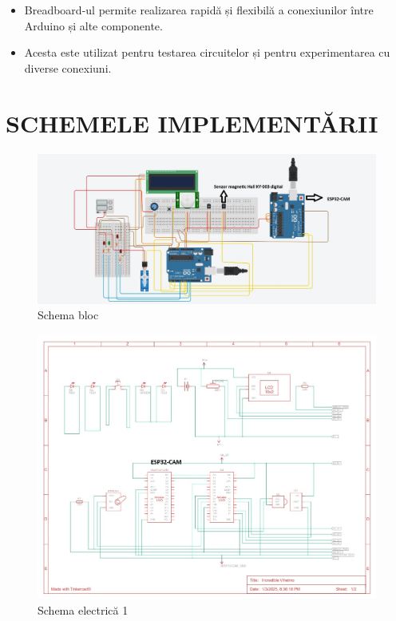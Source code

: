 \documentclass[a4paper,12pt]{report}
\begin{document}
\begin{itemize}
    \item Breadboard-ul permite realizarea rapidă și flexibilă a conexiunilor între Arduino și alte componente.
    \item Acesta este utilizat pentru testarea circuitelor și pentru experimentarea cu diverse conexiuni.
\end{itemize}


\chapter*{SCHEMELE IMPLEMENTĂRII}
\begin{figure}[H]
    \centering
    \includegraphics[width=1.0\linewidth]{SCHEMABLOC.png}
    \caption{Schema bloc}
    \label{fig:enter-label}
\end{figure}

\begin{figure}[H]
    \centering
    \includegraphics[width=0.8\linewidth]{SCH ELECTRICA.jpg}
    \caption{Schema electrică 1}
    \label{fig:enter-label}
\end{figure}
\end{document}
